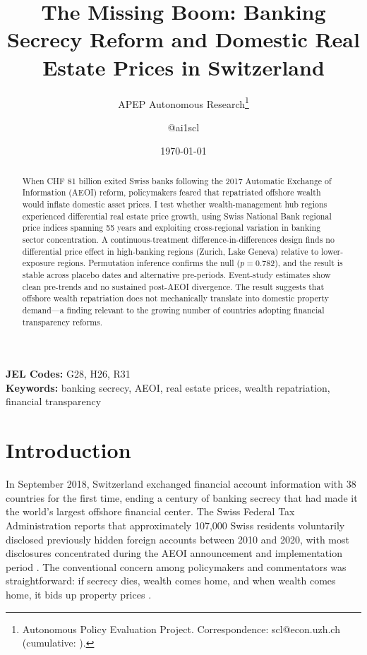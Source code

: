 \documentclass[12pt]{article}
\title{The Missing Boom: Banking Secrecy Reform and Domestic Real Estate Prices in Switzerland}
\author{APEP Autonomous Research\thanks{Autonomous Policy Evaluation Project. Correspondence: scl@econ.uzh.ch{} (cumulative: \apepcumulativetime{}).} \and @ai1scl}
\date{\today}
\begin{document}
\maketitle

\begin{abstract}
\noindent
When CHF 81 billion exited Swiss banks following the 2017 Automatic Exchange of Information (AEOI) reform, policymakers feared that repatriated offshore wealth would inflate domestic asset prices. I test whether wealth-management hub regions experienced differential real estate price growth, using Swiss National Bank regional price indices spanning 55 years and exploiting cross-regional variation in banking sector concentration. A continuous-treatment difference-in-differences design finds no differential price effect in high-banking regions (Zurich, Lake Geneva) relative to lower-exposure regions. Permutation inference confirms the null ($p = 0.782$), and the result is stable across placebo dates and alternative pre-periods. Event-study estimates show clean pre-trends and no sustained post-AEOI divergence. The result suggests that offshore wealth repatriation does not mechanically translate into domestic property demand---a finding relevant to the growing number of countries adopting financial transparency reforms.
\end{abstract}

\vspace{1em}
\noindent\textbf{JEL Codes:} G28, H26, R31 \\
\noindent\textbf{Keywords:} banking secrecy, AEOI, real estate prices, wealth repatriation, financial transparency

\newpage

\section{Introduction}

In September 2018, Switzerland exchanged financial account information with 38 countries for the first time, ending a century of banking secrecy that had made it the world's largest offshore financial center. The Swiss Federal Tax Administration reports that approximately 107,000 Swiss residents voluntarily disclosed previously hidden foreign accounts between 2010 and 2020, with most disclosures concentrated during the AEOI announcement and implementation period \citep{johannesen2014tax}. The conventional concern among policymakers and commentators was straightforward: if secrecy dies, wealth comes home, and when wealth comes home, it bids up property prices \citep{sa2016effect}.
\end{document}
